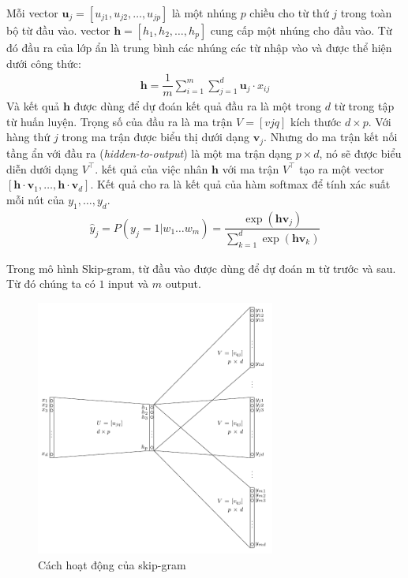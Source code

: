 Mỗi vector $\mathbf u_j = [u_{j1}, u_{j2},\dots,u_{jp}]$ là một nhúng $p$ chiều cho từ thứ $j$ trong toàn bộ từ đầu vào. vector $\mathbf h = [h_1,h_2,\dots,h_p]$ cung cấp một nhúng cho đầu vào. Từ đó đầu ra của lớp ẩn là trung bình các nhúng các từ nhập vào và được thể hiện dưới công thức:
\begin{align}
    \mathbf h=\dfrac{1}{m}\sum_{i=1}^m\sum_{j=1}^d\mathbf u_j\cdot x_{ij}
\end{align}
Và kết quả $\mathbf h$ được dùng để dự đoán kết quả đầu ra là một trong $d$ từ trong tập từ huấn luyện. Trọng số của đầu ra là ma trận $V = [v{jq}]$ kích thước $d\times p$. Với hàng thứ $j$ trong ma trận được biểu thị dưới dạng $\mathbf v_j$. Nhưng do ma trận kết nối tầng ẩn với đầu ra (\textit{hidden-to-output}) là một ma trận dạng $p\times d$, nó sẽ được biểu diễn dưới dạng $V^\intercal$. kết quả của việc nhân $\mathbf h$ với ma trận $V^\intercal$ tạo ra một vector $[\mathbf h\cdot\mathbf v_1,\dots,\mathbf h\cdot \mathbf v_d]$. Kết quả cho ra là kết quả của hàm softmax để tính xác suất mỗi nút của $y_1,\dots,y_d$.
\begin{align}
    \hat y_j=P(y_j=1|w_1\dots w_m)=\dfrac{\exp(\mathbf h\mathbf v_j)}{\sum_{k=1}^d\exp(\mathbf h\mathbf v_k)}
\end{align}

Trong mô hình Skip-gram, từ đầu vào được dùng để dự đoán m từ trước và sau. Từ đó chúng ta có $1$ input và $m$ output.
\begin{figure}[htbp]
    \centering
    \includegraphics[width=0.7\textwidth]{tikz_image/word2vec_skipgram.pdf}
    \caption{Cách hoạt động của skip-gram}
    \label{figure:word2vec-skip-gram}
\end{figure}

